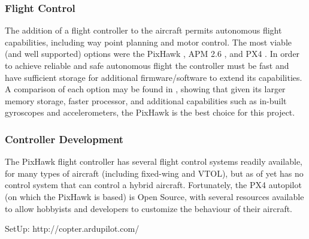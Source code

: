 \subsubsection*{Flight Control}
The addition of a flight controller to the aircraft permits autonomous flight capabilities, including way point planning and motor control. The most viable (and well supported) options were the PixHawk \cite{ref:pixhawk}, APM 2.6 \cite{ref:ardupilot}, and PX4 \cite{ref:px4}. In order to achieve reliable and safe autonomous flight the controller must be fast and have sufficient storage for additional firmware/software to extend its capabilities. A comparison of each option may be found in \cite{ref:controller_comparison}, showing that given its larger memory storage, faster processor, and additional capabilities such as in-built gyroscopes and accelerometers, the PixHawk is the best choice for this project.

\subsubsection*{Controller Development}
The PixHawk flight controller has several flight control systems readily available, for many types of aircraft (including fixed-wing and VTOL), but as of yet has no control system that can control a hybrid aircraft. Fortunately, the PX4 autopilot (on which the PixHawk is based) is Open Source\cite{ref:ardupilotgit}, with several resources available \cite{ref:firmware1,ref:firmware2} to allow hobbyists and developers to customize the behaviour of their aircraft.

\color{red}
SetUp:
http://copter.ardupilot.com/
\color{black}